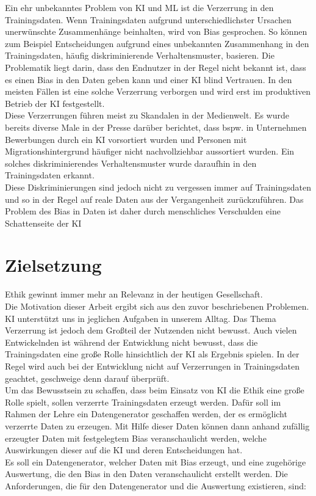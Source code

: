 \begin{onehalfspace}
        Ein ehr unbekanntes Problem von \ac*{KI} und \ac*{ML} ist die Verzerrung in den Trainingsdaten. Wenn Trainingsdaten aufgrund unterschiedlichster Ursachen unerwünschte Zusammenhänge beinhalten, wird von Bias gesprochen. So können zum Beispiel Entscheidungen aufgrund eines unbekannten Zusammenhang in den Trainingsdaten, häufig diskriminierende Verhaltensmuster, basieren. Die Problematik liegt darin, dass den Endnutzer in der Regel nicht bekannt ist, dass es einen Bias in den Daten geben kann und einer \ac*{KI} blind Vertrauen. In den meisten Fällen ist eine solche Verzerrung verborgen und wird erst im produktiven Betrieb der \ac*{KI} festgestellt.
        \\
        Diese Verzerrungen führen meist zu Skandalen in der Medienwelt. Es wurde bereits diverse Male in der Presse darüber berichtet, dass bspw. in Unternehmen Bewerbungen durch ein \ac*{KI} vorsortiert wurden und Personen mit Migrationshintergrund häufiger nicht nachvollziehbar aussortiert wurden. Ein solches diskriminierendes Verhaltensmuster wurde daraufhin in den Trainingsdaten erkannt.
        \\
        Diese Diskriminierungen sind jedoch nicht zu vergessen immer auf Trainingsdaten und so in der Regel auf reale Daten aus der Vergangenheit zurückzuführen. Das Problem des Bias in Daten ist daher durch menschliches Verschulden eine Schattenseite der \ac*{KI} 

        \newpage
        \section{Zielsetzung}
        \label{subsec:zielsetzung}
        Ethik gewinnt immer mehr an Relevanz in der heutigen Gesellschaft. 
        \\
        Die Motivation dieser Arbeit ergibt sich aus den zuvor beschriebenen Problemen. \ac*{KI} unterstützt uns in jeglichen Aufgaben in unserem Alltag. Das Thema Verzerrung ist jedoch dem Großteil der Nutzenden nicht bewusst. Auch vielen Entwickelnden ist während der Entwicklung nicht bewusst, dass die Trainingsdaten eine große Rolle hinsichtlich der \ac*{KI} als Ergebnis spielen. In der Regel wird auch bei der Entwicklung nicht auf Verzerrungen in Trainingsdaten geachtet, geschweige denn darauf überprüft. 
        \\
        Um das Bewusstsein zu schaffen, dass beim Einsatz von \ac*{KI} die Ethik eine große Rolle spielt, sollen verzerrte Trainingsdaten erzeugt werden. Dafür soll im Rahmen der Lehre ein Datengenerator geschaffen werden, der es ermöglicht verzerrte Daten zu erzeugen. Mit Hilfe dieser Daten können dann anhand zufällig erzeugter Daten mit festgelegtem Bias veranschaulicht werden, welche Auswirkungen dieser auf die \ac*{KI} und deren Entscheidungen hat. 
        \\
        Es soll ein Datengenerator, welcher Daten mit Bias erzeugt, und eine zugehörige Auswertung, die den Bias in den Daten veranschaulicht erstellt werden. Die Anforderungen, die für den Datengenerator und die Auswertung existieren, sind:
        

\end{onehalfspace}

